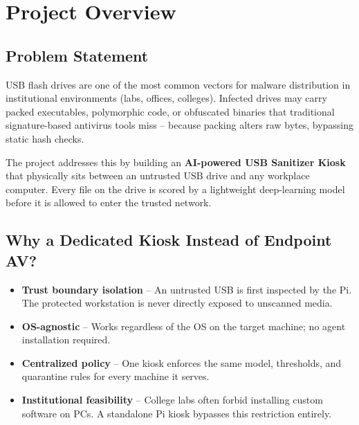 \documentclass[12pt,a4paper]{article}
\begin{document}
\tableofcontents
\newpage

\section{Project Overview}

\subsection{Problem Statement}
USB flash drives are one of the most common vectors for malware distribution in
institutional environments (labs, offices, colleges).  Infected drives may carry
packed executables, polymorphic code, or obfuscated binaries that traditional
signature-based antivirus tools miss -- because packing alters raw bytes,
bypassing static hash checks.

The project addresses this by building an \textbf{AI-powered USB Sanitizer
Kiosk} that physically sits between an untrusted USB drive and any workplace
computer.  Every file on the drive is scored by a lightweight deep-learning
model before it is allowed to enter the trusted network.

\subsection{Why a Dedicated Kiosk Instead of Endpoint AV?}

\begin{tcolorbox}[infobox, title={Deployment Architecture Rationale}]
\begin{itemize}
  \item \textbf{Trust boundary isolation} -- An untrusted USB is first
        inspected by the Pi. The protected workstation is never directly exposed
        to unscanned media.
  \item \textbf{OS-agnostic} -- Works regardless of the OS on the target
        machine; no agent installation required.
  \item \textbf{Centralized policy} -- One kiosk enforces the same model,
        thresholds, and quarantine rules for every machine it serves.
  \item \textbf{Institutional feasibility} -- College labs often forbid
        installing custom software on PCs.  A standalone Pi kiosk bypasses this
        restriction entirely.
\end{itemize}
\end{tcolorbox}
\end{document}
